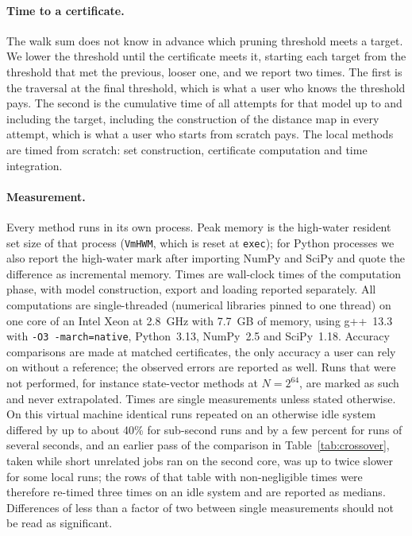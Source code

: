 \paragraph*{Time to a certificate.} The walk sum does not know in advance which pruning threshold meets a target. We lower the threshold until the certificate meets it, starting each target from the threshold that met the previous, looser one, and we report two times. The first is the traversal at the final threshold, which is what a user who knows the threshold pays. The second is the cumulative time of all attempts for that model up to and including the target, including the construction of the distance map in every attempt, which is what a user who starts from scratch pays. The local methods are timed from scratch: set construction, certificate computation and time integration.

\paragraph*{Measurement.} Every method runs in its own process. Peak memory is the high-water resident set size of that process (\texttt{VmHWM}, which is reset at \texttt{exec}); for Python processes we also report the high-water mark after importing NumPy and SciPy and quote the difference as incremental memory. Times are wall-clock times of the computation phase, with model construction, export and loading reported separately. All computations are single-threaded (numerical libraries pinned to one thread) on one core of an Intel Xeon at 2.8~GHz with 7.7~GB of memory, using g++~13.3 with \texttt{-O3 -march=native}, Python~3.13, NumPy~2.5 and SciPy~1.18. Accuracy comparisons are made at matched certificates, the only accuracy a user can rely on without a reference; the observed errors are reported as well. Runs that were not performed, for instance state-vector methods at $N=2^{64}$, are marked as such and never extrapolated. Times are single measurements unless stated otherwise. On this virtual machine identical runs repeated on an otherwise idle system differed by up to about 40\% for sub-second runs and by a few percent for runs of several seconds, and an earlier pass of the comparison in Table~\ref{tab:crossover}, taken while short unrelated jobs ran on the second core, was up to twice slower for some local runs; the rows of that table with non-negligible times were therefore re-timed three times on an idle system and are reported as medians. Differences of less than a factor of two between single measurements should not be read as significant.
